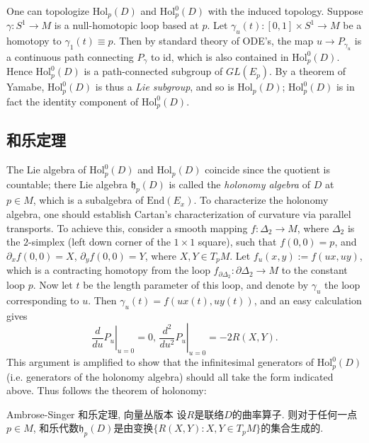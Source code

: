 One can topologize $\text{Hol}_p(D)$ and $\text{Hol}_p^0(D)$ with the induced topology. Suppose $\gamma:S^1\to M$ is a null-homotopic loop based at $p$. Let $\gamma_u(t):[0,1]\times S^1\to M$ be a homotopy to $\gamma_1(t)\equiv p$. Then by standard theory of ODE's, the map $u\to P_{\gamma_u}$ is a continuous path connecting $P_\gamma$ to $\text{id}$, which is also contained in $\text{Hol}_p^0(D)$. Hence $\text{Hol}_p^0(D)$ is a path-connected subgroup of $GL(E_p)$. By a theorem of Yamabe, $\text{Hol}_p^0(D)$ is thus a \emph{Lie subgroup}, and so is $\text{Hol}_p(D)$; $\text{Hol}_p^0(D)$ is in fact the identity component of $\text{Hol}_p^0(D)$.

\subsection{和乐定理}
The Lie algebra of $\text{Hol}_p^0(D)$ and $\text{Hol}_p(D)$ coincide since the quotient is countable; there Lie algebra $\mathfrak{h}_p(D)$ is called the \emph{holonomy algebra} of $D$ at $p\in M$, which is a subalgebra of $\text{End}(E_x)$. To characterize the holonomy algebra, one should establish Cartan's characterization of curvature via parallel transports. To achieve this, consider a smooth mapping $f:\Delta_2\to M$, where $\Delta_2$ is the $2$-simplex (left down corner of the $1\times1$ square), such that $f(0,0)=p$, and $\partial_xf(0,0)=X$, $\partial_yf(0,0)=Y$, where $X,Y\in T_pM$. Let $f_u(x,y):=f(ux,uy)$, which is a contracting homotopy from the loop $f_{\partial\Delta_2}:\partial\Delta_2\to M$ to the constant loop $p$. Now let $t$ be the length parameter of this loop, and denote by $\gamma_u$ the loop corresponding to $u$. Then $\gamma_u(t)=f(ux(t),uy(t))$, and an easy calculation gives
$$\left.\frac{d}{du}P_u\right|_{u=0}=0,\,\left.\frac{d^2}{du^2}P_u\right|_{u=0}=-2R(X,Y).$$
This argument is amplified to show that the infinitesimal generators of $\text{Hol}_p^0(D)$ (i.e. generators of the holonomy algebra) should all take the form indicated above. Thus follows the theorem of holonomy:

\begin{theorem}{Ambrose-Singer 和乐定理, 向量丛版本}
设$R$是联络$D$的曲率算子. 则对于任何一点$p\in M$, 和乐代数$\mathfrak{h}_p(D)$是由变换$\{R(X,Y):X,Y\in T_pM\}$的集合生成的.
\end{theorem}